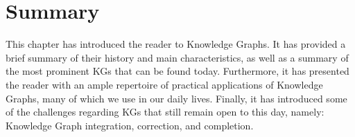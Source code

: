 
\section{Summary}\label{sec:kgs-summary}
This chapter has introduced the reader to Knowledge Graphs. It has provided a brief summary of their history and main characteristics, as well as a summary of the most prominent KGs that can be found today. Furthermore, it has presented the reader with an ample repertoire of practical applications of Knowledge Graphs, many of which we use in our daily lives. Finally, it has introduced some of the challenges regarding KGs that still remain open to this day, namely: Knowledge Graph integration, correction, and completion.
